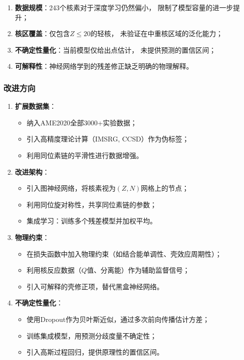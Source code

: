 \documentclass[12pt, a4paper]{article}
\begin{document}
\begin{enumerate}
  \item \textbf{数据规模}：243个核素对于深度学习仍然偏小，
        限制了模型容量的进一步提升；
  \item \textbf{核区覆盖}：仅包含$Z \leq 20$的轻核，
        未验证在中重核区域的泛化能力；
  \item \textbf{不确定性量化}：当前模型仅给出点估计，
        未提供预测的置信区间；
  \item \textbf{可解释性}：神经网络学到的残差修正缺乏明确的物理解释。
\end{enumerate}

\subsubsection{改进方向}

\begin{enumerate}
  \item \textbf{扩展数据集}：
        \begin{itemize}
          \item 纳入AME2020全部3000+实验数据；
          \item 引入高精度理论计算（IMSRG, CCSD）作为伪标签；
          \item 利用同位素链的平滑性进行数据增强。
        \end{itemize}

  \item \textbf{改进架构}：
        \begin{itemize}
          \item 引入图神经网络，将核素视为$(Z, N)$网格上的节点；
          \item 利用同位旋对称性，共享同位素链的参数；
          \item 集成学习：训练多个残差模型并加权平均。
        \end{itemize}

  \item \textbf{物理约束}：
        \begin{itemize}
          \item 在损失函数中加入物理约束（如结合能单调性、壳效应周期性）；
          \item 利用核反应数据（$Q$值、分离能）作为辅助监督信号；
          \item 引入可解释的壳修正项，替代黑盒神经网络。
        \end{itemize}

  \item \textbf{不确定性量化}：
        \begin{itemize}
          \item 使用Dropout作为贝叶斯近似，通过多次前向传播估计方差；
          \item 训练集成模型，用预测分歧度量不确定性；
          \item 引入高斯过程回归，提供原理性的置信区间。
        \end{itemize}
\end{enumerate}
\end{document}
